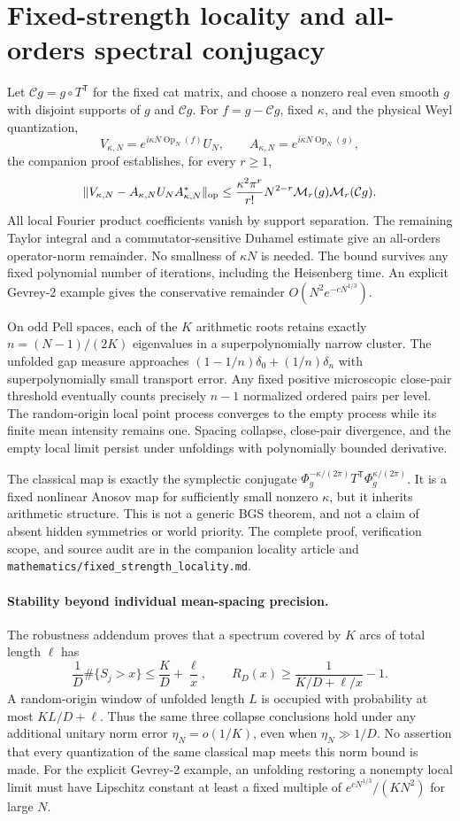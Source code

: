 \section{Fixed-strength locality and all-orders spectral conjugacy}
Let $\mathcal Cg=g\circ T^{\mathsf T}$ for the fixed cat matrix, and choose a
nonzero real even smooth $g$ with disjoint supports of $g$ and $\mathcal Cg$.
For $f=g-\mathcal Cg$, fixed $\kappa$, and the physical Weyl quantization,
\[
 V_{\kappa,N}=e^{i\kappa N\operatorname{Op}_N(f)}U_N,
 \qquad A_{\kappa,N}=e^{i\kappa N\operatorname{Op}_N(g)},
\]
the companion proof establishes, for every $r\geq1$,
\[
 \|V_{\kappa,N}-A_{\kappa,N}U_NA_{\kappa,N}^*\|_{\rm op}
 \leq \frac{\kappa^2\pi^r}{r!}N^{2-r}
       \mathcal M_r(g)\mathcal M_r(\mathcal Cg).
\]
All local Fourier product coefficients vanish by support separation. The
remaining Taylor integral and a commutator-sensitive Duhamel estimate give
an all-orders operator-norm remainder. No smallness of $\kappa N$ is needed.
The bound survives any fixed polynomial number of iterations, including
the Heisenberg time. An explicit Gevrey-2 example gives the conservative
remainder $O(N^2e^{-cN^{1/3}})$.

On odd Pell spaces, each of the $K$ arithmetic roots retains exactly
$n=(N-1)/(2K)$ eigenvalues in a superpolynomially narrow cluster. The
unfolded gap measure approaches $(1-1/n)\delta_0+(1/n)\delta_n$ with
superpolynomially small transport error. Any fixed positive microscopic
close-pair threshold eventually counts precisely $n-1$ normalized ordered
pairs per level. The random-origin local point process converges to the
empty process while its finite mean intensity remains one. Spacing collapse,
close-pair divergence, and the empty local limit persist under unfoldings
with polynomially bounded derivative.

The classical map is exactly the symplectic conjugate
$\Phi_g^{-\kappa/(2\pi)}T^{\mathsf T}\Phi_g^{\kappa/(2\pi)}$.
It is a fixed nonlinear Anosov map for sufficiently small nonzero $\kappa$,
but it inherits arithmetic structure. This is not a generic BGS theorem,
and not a claim of absent hidden symmetries or world priority. The complete
proof, verification scope, and source audit are in the companion locality
article and \texttt{mathematics/fixed\_strength\_locality.md}.


\paragraph{Stability beyond individual mean-spacing precision.}
The robustness addendum proves that a spectrum covered by $K$ arcs of total
length $\ell$ has
\[
 \frac1D\#\{S_j>x\}\leq\frac KD+\frac\ell x,
 \qquad R_D(x)\geq\frac1{K/D+\ell/x}-1.
\]
A random-origin window of unfolded length $L$ is occupied with probability
at most $KL/D+\ell$. Thus the same three collapse conclusions hold under
any additional unitary norm error $\eta_N=o(1/K)$, even when
$\eta_N\gg1/D$. No assertion that every quantization of the same classical
map meets this norm bound is made. For the explicit Gevrey-2 example, an
unfolding restoring a nonempty local limit must have Lipschitz constant at
least a fixed multiple of $e^{cN^{1/3}}/(KN^2)$ for large $N$.
